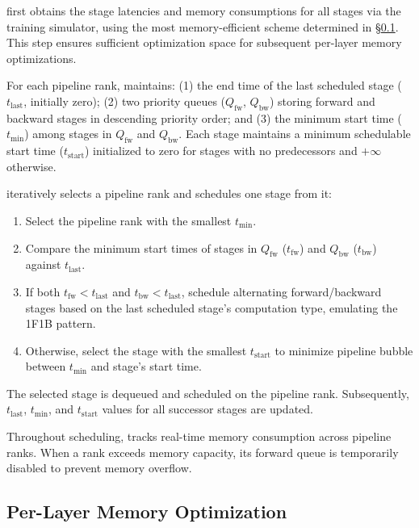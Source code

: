 \sys{} first obtains the stage latencies and memory consumptions for all stages via the training simulator,
using the most memory-efficient scheme determined in \S\ref{section:memory-optimization}.
This step ensures sufficient optimization space for subsequent per-layer memory optimizations.

For each pipeline rank, \sys{} maintains:
(1) the end time of the last scheduled stage ($t_\mathrm{last}$, initially zero);
(2) two priority queues ($Q_\mathrm{fw}$, $Q_\mathrm{bw}$) storing forward and backward stages in descending priority order; and
(3) the minimum start time ($t_\mathrm{min}$) among stages in $Q_\mathrm{fw}$ and $Q_\mathrm{bw}$.
Each stage maintains a minimum schedulable start time ($t_\mathrm{start}$) initialized to zero for stages with no predecessors and $+\infty$ otherwise.

\sys{} iteratively selects a pipeline rank and schedules one stage from it:
\begin{enumerate}
    \item Select the pipeline rank with the smallest $t_\mathrm{min}$.
    \item Compare the minimum start times of stages in $Q_\mathrm{fw}$ ($t_\mathrm{fw}$) and $Q_\mathrm{bw}$ ($t_\mathrm{bw}$) against $t_\mathrm{last}$.
    \item If both $t_\mathrm{fw} < t_\mathrm{last}$ and $t_\mathrm{bw} < t_\mathrm{last}$,
          schedule alternating forward/backward stages based on the last scheduled stage's computation type,
          emulating the 1F1B pattern.
    \item Otherwise, select the stage with the smallest $t_\mathrm{start}$ to minimize pipeline bubble between $t_\mathrm{min}$ and stage's start time.
\end{enumerate}

The selected stage is dequeued and scheduled on the pipeline rank.
Subsequently, $t_\mathrm{last}$, $t_\mathrm{min}$, and $t_\mathrm{start}$ values for all successor stages are updated.

Throughout scheduling, \sys{} tracks real-time memory consumption across pipeline ranks.
When a rank exceeds memory capacity, its forward queue is temporarily disabled to prevent memory overflow.

\subsection{Per-Layer Memory Optimization}
\label{section:memory-optimization}

